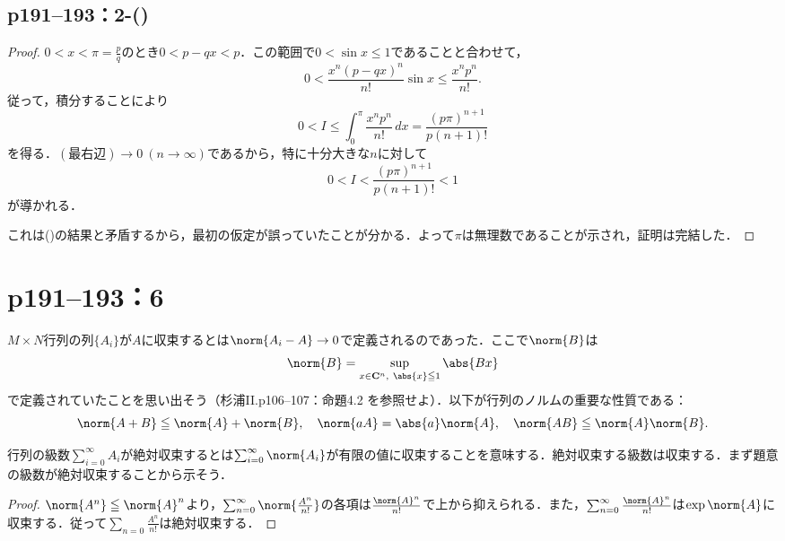 \subsection*{p191--193：2-()}

\begin{tleftbar}
    \begin{proof}
        $0 < x < \pi = \frac{p}{q}$のとき$0 < p - qx < p$．この範囲で$0 < \sin x \leq 1$であることと合わせて，
        \[
            0 < \frac{x^n(p - qx)^n}{n!}\sin x \leq \frac{x^np^n}{n!}.
        \]
        従って，積分することにより
        \[
            0 < I \leq \int_{0}^{\pi} \frac{x^np^n}{n!}\, dx = \frac{(p\pi)^{n+1}}{p(n+1)!}
        \]
        を得る．$(\text{最右辺}) \to 0\ (n \to \infty)$であるから，特に十分大きな$n$に対して
        \[
            0 < I < \frac{(p\pi)^{n+1}}{p(n+1)!} < 1
        \]
        が導かれる．

        これは()の結果と矛盾するから，最初の仮定が誤っていたことが分かる．よって$\pi$は無理数であることが示され，証明は完結した．
    \end{proof}
\end{tleftbar}


\section*{p191--193：6}

$M \times N$行列の列$\{A_i\}$が$A$に収束するとは$\norm{A_i - A} \to 0$で定義されるのであった．ここで$\norm{B}$は
\[
    \norm{B} = \sup_{x \in \mathbf{C}^n,\ \abs{x} \leqq 1}\abs{Bx}
\]
で定義されていたことを思い出そう（杉浦II.p106--107：命題4.2 を参照せよ）．以下が行列のノルムの重要な性質である：
\[
    \norm{A + B} \leq \norm{A} + \norm{B}, \quad \norm{aA} = \abs{a}\norm{A}, \quad \norm{AB} \leq \norm{A}\norm{B}.
\]

行列の級数$\sum_{i=0}^\infty A_i$が絶対収束するとは$\sum_{i=0}^\infty \norm{A_i}$が有限の値に収束することを意味する．絶対収束する級数は収束する．まず題意の級数が絶対収束することから示そう．

\begin{tleftbar}
    \begin{proof}
        $\norm{A^n} \leq \norm{A}^n$より，$\sum_{n = 0}^\infty \norm{\frac{A^n}{n!}}$の各項は$\frac{\norm{A}^n}{n!}$で上から抑えられる．また，$\sum_{n=0}^\infty \frac{\norm{A}^n}{n!}$は$\exp \norm{A}$に収束する．従って$\sum_{n = 0} \frac{A^n}{n!}$は絶対収束する．
    \end{proof}
\end{tleftbar}


